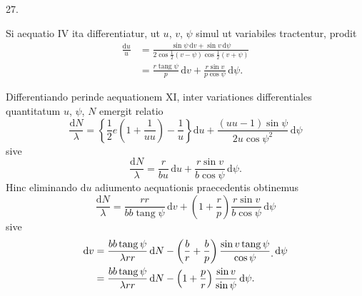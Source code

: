 \begin{center}
\hypertarget{native-043-article027}{}27.
\end{center}
Si aequatio IV ita differentiatur, ut $u$, $v$, $\psi$ simul ut variabiles tractentur, prodit
\[
\begin{aligned}
\frac{\mathrm{d}u}{u}&=\frac{\sin\psi\,\mathrm{d}v+\sin v\,\mathrm{d}\psi}{2\cos\frac{1}{2}(v-\psi)\cos\frac{1}{2}(v+\psi)}\\
&=\frac{r\operatorname{tang}\psi}{p}\,\mathrm{d}v+\frac{r\sin v}{p\cos\psi}\,\mathrm{d}\psi.
\end{aligned}
\]

Differentiando perinde aequationem XI, inter variationes differentiales quantitatum $u$, $\psi$, $N$ emergit relatio
\[
\frac{\mathrm{d}N}{\lambda}=\left\{\frac{1}{2}e\left(1+\frac{1}{uu}\right)-\frac{1}{u}\right\}\mathrm{d}u+\frac{(uu-1)\sin\psi}{2u\cos\psi^2}\,\mathrm{d}\psi
\]
sive
\[
\frac{\mathrm{d}N}{\lambda}=\frac{r}{bu}\,\mathrm{d}u+\frac{r\sin v}{b\cos\psi}\,\mathrm{d}\psi.
\]
Hinc eliminando $\mathrm{d}u$ adiumento aequationis praecedentis obtinemus
\[
\frac{\mathrm{d}N}{\lambda}=\frac{rr}{bb\operatorname{tang}\psi}\,\mathrm{d}v+\left(1+\frac{r}{p}\right)\frac{r\sin v}{b\cos\psi}\,\mathrm{d}\psi
\]
sive
\[
\begin{aligned}
\mathrm{d}v&=\frac{bb\operatorname{tang}\psi}{\lambda rr}\,\mathrm{d}N-\left(\frac{b}{r}+\frac{b}{p}\right)\frac{\sin v\operatorname{tang}\psi}{\cos\psi}\raisebox{-.6ex}{.}\,\mathrm{d}\psi\\
&=\frac{bb\operatorname{tang}\psi}{\lambda rr}\,\mathrm{d}N-\left(1+\frac{p}{r}\right)\frac{\sin v}{\sin\psi}\,\mathrm{d}\psi.
\end{aligned}
\]


